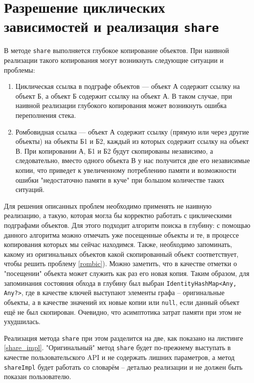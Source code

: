 \documentclass[specification,annotation,times]{itmo-student-thesis}
\begin{document}
\section{Разрешение циклических зависимостей и реализация \texttt{share}}\label{share_cyclic}

В методе \texttt{share} выполняется глубокое копирование объектов. При наивной реализации такого копирования могут возникнуть следующие ситуации и проблемы:

\begin{enumerate}
	\item \label{cyclic} Циклическая ссылка в подграфе объектов --- объект А содержит ссылку на объект Б, а объект Б содержит ссылку на объект А. В таком случае, при наивной реализации глубокого копирования может возникнуть ошибка переполнения стека.
	\item \label{rombic} Ромбовидная ссылка --- объект А содержит ссылку (прямую или через другие объекты) на объекты Б1 и Б2, каждый из которых содержит ссылку на объект В. При копировании А, Б1 и Б2 будут скопированы независимо, а следовательно, вместо одного объекта В у нас получится две его независимые копии, что приведет к увеличенному потреблению памяти и возможности ошибки "недостаточно памяти в куче" при большом количестве таких ситуаций.
\end{enumerate}

Для решения описанных проблем необходимо применять не наивную реализацию,
а такую, которая могла бы корректно работать с циклическими подграфами объектов.
Для этого подходит алгоритм поиска в глубину: с помощью данного алгоритма можно отмечать уже посещенные объекты и те, в процессе копирования которых мы сейчас находимся.
Также, необходимо запоминать, какому из оригинальных объектов какой скопированный объект соответствует, чтобы решить проблему \ref{rombic}). 
Можно заметить, что в качестве отметки о "посещении" объекта может служить как раз его новая копия.
Таким образом, для запоминания состояния обхода в глубину был выбран \texttt{IdentityHashMap<Any, Any?>}, где в качестве ключей выступают элементы графа -- оригинальные объекты, а в качестве значений их новые копии или \texttt{null}, если данный объект ещё не был скопирован.
Очевидно, что асимптотика затрат памяти при этом не ухудшилась.

Реализация метода \texttt{share} при этом разделится на две, как показано на листинге \ref{share_impl}.
"Оригинальный" метод \texttt{share} будет по-прежнему выступать в качестве пользовательского API и не содержать лишних параметров, а метод \texttt{shareImpl} будет работать со словарём -- деталью реализации и не должен быть показан пользователю.
\end{document}
